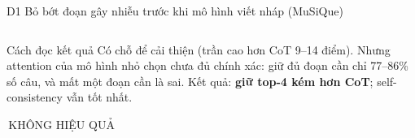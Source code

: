 \documentclass[aspectratio=169,t]{beamer}
\newcommand{\nhanS}[2]{{\setlength{\fboxsep}{0.8pt}\colorbox{#1}{\tiny\bfseries\color{white}\rule[-1.1pt]{0pt}{5.6pt}\,#2\,}}}
\newcommand{\FAILs}{\nhanS{failc}{KHÔNG HIỆU QUẢ}}
\begin{document}
\begin{frame}[shrink]{D1 \textperiodcentered{} Bỏ bớt đoạn gây nhiễu trước khi mô hình viết nháp (MuSiQue)}
\begin{columns}[T,onlytextwidth]
\begin{exampleblock}{Cách đọc kết quả}
\scriptsize
Có chỗ để cải thiện (trần cao hơn CoT 9--14 điểm). Nhưng attention của mô hình nhỏ chọn chưa đủ chính xác: giữ đủ đoạn cần chỉ 77--86\% số câu, và mất một đoạn cần là sai. Kết quả: \textbf{giữ top-4 kém hơn CoT}; self-consistency vẫn tốt nhất. \FAILs
\end{exampleblock}
\end{columns}
\par\kern0pt
\end{frame}

\end{document}

